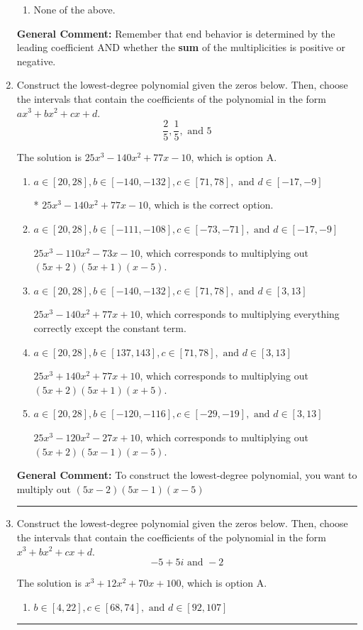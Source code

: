 \documentclass{extbook}[14pt]
\newcommand{\litem}[1]{\item #1

\rule{\textwidth}{0.4pt}}
\begin{document}
\begin{enumerate}
{\begin{enumerate}[label=\Alph*.]
\begin{multicols}{2}
\end{multicols}\item None of the above.\end{enumerate}
\textbf{General Comment:} Remember that end behavior is determined by the leading coefficient AND whether the \textbf{sum} of the multiplicities is positive or negative.
}
\litem{
Construct the lowest-degree polynomial given the zeros below. Then, choose the intervals that contain the coefficients of the polynomial in the form $ax^3+bx^2+cx+d$.
\[ \frac{2}{5}, \frac{1}{5}, \text{ and } 5 \]

The solution is \( 25x^{3} -140 x^{2} +77 x -10 \), which is option A.\begin{enumerate}[label=\Alph*.]
\item \( a \in [20, 28], b \in [-140, -132], c \in [71, 78], \text{ and } d \in [-17, -9] \)

* $25x^{3} -140 x^{2} +77 x -10$, which is the correct option.
\item \( a \in [20, 28], b \in [-111, -108], c \in [-73, -71], \text{ and } d \in [-17, -9] \)

$25x^{3} -110 x^{2} -73 x -10$, which corresponds to multiplying out $(5x + 2)(5x + 1)(x -5)$.
\item \( a \in [20, 28], b \in [-140, -132], c \in [71, 78], \text{ and } d \in [3, 13] \)

$25x^{3} -140 x^{2} +77 x + 10$, which corresponds to multiplying everything correctly except the constant term.
\item \( a \in [20, 28], b \in [137, 143], c \in [71, 78], \text{ and } d \in [3, 13] \)

$25x^{3} +140 x^{2} +77 x + 10$, which corresponds to multiplying out $(5x + 2)(5x + 1)(x + 5)$.
\item \( a \in [20, 28], b \in [-120, -116], c \in [-29, -19], \text{ and } d \in [3, 13] \)

$25x^{3} -120 x^{2} -27 x + 10$, which corresponds to multiplying out $(5x + 2)(5x -1)(x -5)$.
\end{enumerate}

\textbf{General Comment:} To construct the lowest-degree polynomial, you want to multiply out $(5x -2)(5x -1)(x -5)$
}
\litem{
Construct the lowest-degree polynomial given the zeros below. Then, choose the intervals that contain the coefficients of the polynomial in the form $x^3+bx^2+cx+d$.
\[ -5 + 5 i \text{ and } -2 \]

The solution is \( x^{3} +12 x^{2} +70 x + 100 \), which is option A.\begin{enumerate}[label=\Alph*.]
\item \( b \in [4, 22], c \in [68, 74], \text{ and } d \in [92, 107] \)


\end{enumerate}}
\end{enumerate}
\end{document}
